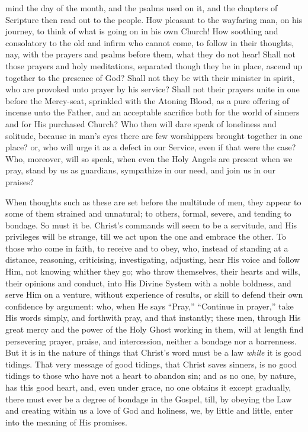 mind the day of the month, and the psalms used on it, and the chapters
of Scripture then read out to the people. How pleasant to the
wayfaring man, on his journey, to think of what is going on in his own
Church! How soothing and consolatory to the old and infirm who cannot
come, to follow in their thoughts, nay, with the prayers and psalms
before them, what they do not hear! Shall not those prayers and holy
meditations, separated though they be in place, ascend up together to
the presence of God? Shall not they be with their minister in spirit,
who are provoked unto prayer by his service? Shall not their prayers
unite in one before the Mercy-seat, sprinkled with the Atoning Blood,
as a pure offering of incense unto the Father, and an acceptable
sacrifice both for the world of sinners and for His purchased Church?
Who then will dare speak of loneliness and solitude, because in man's
eyes there are few worshippers brought together in one place? or, who
will urge it as a defect in our Service, even if that were the case?
Who, moreover, will so speak, when even the Holy Angels are present
when we pray, stand by us as guardians, sympathize in our need, and
join us in our praises?

When thoughts such as these are set before the multitude of men,
they appear to some of them strained and unnatural; to others, formal,
severe, and tending to bondage. So must it be. Christ's commands
will seem to be a servitude, and His privileges will be strange, till
we act upon the one and embrace the other. To those who come in faith,
to receive and to obey, who, instead of standing at a distance,
reasoning, criticising, investigating, adjusting, hear His voice and
follow Him, not knowing whither they go; who throw themselves, their
hearts and wills, their opinions and conduct, into His Divine System
with a noble boldness, and serve Him on a venture, without experience
of results, or skill to defend their own confidence by argument: who,
when He says ``Pray,'' ``Continue in prayer,'' take
His words simply, and forthwith pray, and that instantly; these men,
through His great mercy and the power of the Holy Ghost working in
them, will at length find persevering prayer, praise, and
intercession, neither a bondage nor a barrenness. But it is in the
nature of things that Christ's word must be a law \emph{while} it is
good tidings. That very message of good tidings, that Christ saves
sinners, is no good tidings to those who have not a heart to abandon
sin; and as no one, by nature, has this good heart, and, even under
grace, no one obtains it except gradually, there must ever be a degree of
bondage in the Gospel, till, by obeying the Law and creating within us
a love of God and holiness, we, by little and little, enter into the
meaning of His promises.

